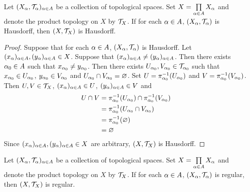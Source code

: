 \documentclass{book}
\begin{document}
	\begin{ex}
		Let $(X_{\alpha}, \mathcal{T}_{\alpha})_{\alpha \in A}$ be a collection of topological spaces. Set $X = \prod\limits_{\alpha \in A} X_{\alpha}$ and denote the product topology on $X$ by $\mathcal{T}_X$. If for each $\alpha \in A$, $(X_{\alpha}, \mathcal{T}_{\alpha})$ is Hausdorff, then $(X, \mathcal{T}_X)$ is Hausdorff.
	\end{ex}
	
	\begin{proof}
		Suppose that for each $\alpha \in A$, $(X_{\alpha}, \mathcal{T}_{\alpha})$ is Hausdorff. Let $(x_{\alpha})_{\alpha \in A}, (y_{\alpha})_{\alpha \in A} \in X$. Suppose that $(x_{\alpha})_{\alpha \in A} \neq (y_{\alpha})_{\alpha \in A}$. Then there exists $\alpha_0 \in A$ such that $x_{\alpha_0} \neq y_{\alpha_0}$. Then there exists $U_{\alpha_0}, V_{\alpha_0} \in \mathcal{T}_{\alpha_0}$ such that $x_{\alpha_0} \in U_{\alpha_0}$, $y_{\alpha_0} \in V_{\alpha_0}$ and $U_{\alpha_0} \cap V_{\alpha_0} = \varnothing$. Set $U = \pi_{\alpha_0}^{-1}(U_{\alpha_0})$ and $V = \pi_{\alpha_0}^{-1}(V_{\alpha_0})$. Then $U, V \in \mathcal{T}_X$, $(x_{\alpha})_{\alpha \in A} \in U$, $(y_{\alpha})_{\alpha \in A} \in V$ and 
		\begin{align*}
			U \cap V
			& = \pi_{\alpha_0}^{-1}(U_{\alpha_0}) \cap \pi_{\alpha_0}^{-1}(V_{\alpha_0}) \\
			& = \pi_{\alpha_0}^{-1}(U_{\alpha_0} \cap V_{\alpha_0}) \\
			& = \pi_{\alpha_0}^{-1}(\varnothing) \\
			& = \varnothing
		\end{align*}
		Since $(x_{\alpha})_{\alpha \in A}, (y_{\alpha})_{\alpha \in A} \in X$ are arbitrary, $(X, \mathcal{T}_X)$ is Hausdorff.
	\end{proof}
	
	\begin{ex}
		Let $(X_{\alpha}, \mathcal{T}_{\alpha})_{\alpha \in A}$ be a collection of topological spaces. Set $X = \prod\limits_{\alpha \in A} X_{\alpha}$ and denote the product topology on $X$ by $\mathcal{T}_X$. If for each $\alpha \in A$, $(X_{\alpha}, \mathcal{T}_{\alpha})$ is regular, then $(X, \mathcal{T}_X)$ is regular. 
	\end{ex}
\end{document}
